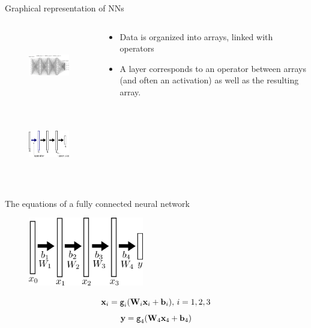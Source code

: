 \documentclass[xcolor=pdftex,dvipsnames,table,mathserif]{beamer}
\begin{document}
\begin{frame}{Graphical representation of NNs}

\begin{columns}
  \begin{column}{.5\textwidth}
    \begin{figure}
      \includegraphics[height=3cm]{../graphics/network.png}
    \end{figure}
    \begin{figure}
      \includegraphics[height=3cm]{../graphics/nn_representation}
    \end{figure}
  \end{column}

  \begin{column}{.5\textwidth}
    \begin{itemize}
    \item Data is organized into arrays, linked with operators
    \item A layer corresponds to an operator between arrays (and often an activation) as well as the resulting array.
    \end{itemize}
  \end{column}
\end{columns}


\end{frame}


\begin{frame}{The equations of a fully connected neural network}

    \begin{figure}
      \includegraphics[height=3cm]{../graphics/nn_representation2}
    \end{figure}

    \begin{block}{}
      \[\mathbf{x}_i = \texttt{g}_i(\mathbf{W}_i\mathbf{x}_i + \mathbf{b}_i),\, i= 1, 2, 3 \]
      \[\mathbf{y} = \texttt{g}_4(\mathbf{W}_4 \mathbf{x}_4 + \mathbf{b}_4)\]
    \end{block}

\end{frame}
\end{document}
